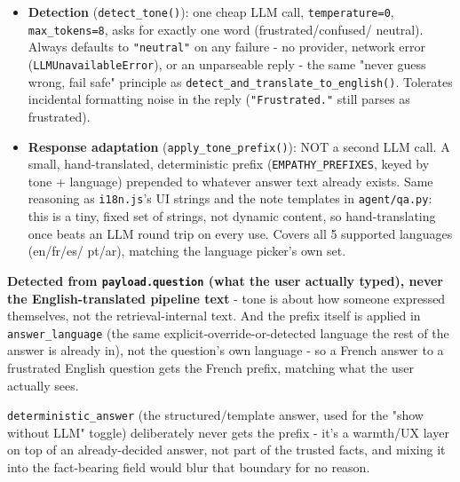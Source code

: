 \begin{itemize}
\item \textbf{Detection} (\texttt{detect\_\allowbreak{}tone()}): one cheap LLM call, \texttt{temperature=0}, \texttt{max\_\allowbreak{}tokens=8}, asks for exactly one word (frustrated/confused/ neutral). Always defaults to \texttt{"neutral"} on any failure - no provider, network error (\texttt{LLMUnavailableError}), or an unparseable reply - the same "never guess wrong, fail safe" principle as \texttt{detect\_\allowbreak{}and\_\allowbreak{}translate\_\allowbreak{}to\_\allowbreak{}english()}. Tolerates incidental formatting noise in the reply (\texttt{"Frustrated."} still parses as frustrated).
\item \textbf{Response adaptation} (\texttt{apply\_\allowbreak{}tone\_\allowbreak{}prefix()}): NOT a second LLM call. A small, hand-translated, deterministic prefix (\texttt{EMPATHY\_\allowbreak{}PREFIXES}, keyed by tone + language) prepended to whatever answer text already exists. Same reasoning as \texttt{i18n.js}'s UI strings and the note templates in \texttt{agent/\allowbreak{}qa.py}: this is a tiny, fixed set of strings, not dynamic content, so hand-translating once beats an LLM round trip on every use. Covers all 5 supported languages (en/fr/es/ pt/ar), matching the language picker's own set.
\end{itemize}
\textbf{Detected from \texttt{payload.question} (what the user actually typed), never the English-translated pipeline text} - tone is about how someone expressed themselves, not the retrieval-internal text. And the prefix itself is applied in \texttt{answer\_\allowbreak{}language} (the same explicit-override-or-detected language the rest of the answer is already in), not the question's own language - so a French answer to a frustrated English question gets the French prefix, matching what the user actually sees.

\texttt{deterministic\_\allowbreak{}answer} (the structured/template answer, used for the "show without LLM" toggle) deliberately never gets the prefix - it's a warmth/UX layer on top of an already-decided answer, not part of the trusted facts, and mixing it into the fact-bearing field would blur that boundary for no reason.

